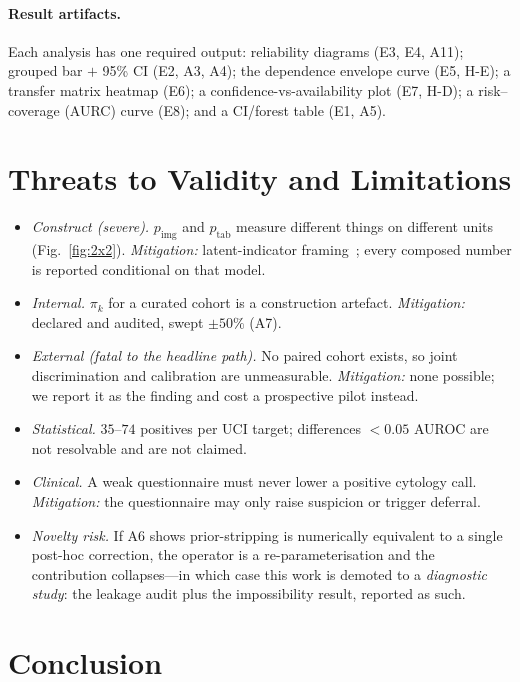 \documentclass[sigplan,nonacm,screen]{acmart}
\begin{document}
\paragraph{Result artifacts.} Each analysis has one required output: reliability diagrams (E3, E4, A11); grouped bar $+$ 95\% CI (E2, A3, A4); the dependence envelope curve (E5, H-E); a transfer matrix heatmap (E6); a confidence-vs-availability plot (E7, H-D); a risk--coverage (AURC) curve (E8); and a CI/forest table (E1, A5).

\section{Threats to Validity and Limitations}

\begin{itemize}
  \item \emph{Construct (severe).} $p_{\mathrm{img}}$ and $p_{\mathrm{tab}}$ measure different things on different units (Fig.~\ref{fig:2x2}). \emph{Mitigation:} latent-indicator framing~\cite{rutjes2007evaluation}; every composed number is reported conditional on that model.
  \item \emph{Internal.} $\pi_k$ for a curated cohort is a construction artefact. \emph{Mitigation:} declared and audited, swept $\pm50\%$ (A7).
  \item \emph{External (fatal to the headline path).} No paired cohort exists, so joint discrimination and calibration are unmeasurable. \emph{Mitigation:} none possible; we report it as the finding and cost a prospective pilot instead.
  \item \emph{Statistical.} $35$--$74$ positives per UCI target; differences $<0.05$ AUROC are not resolvable and are not claimed.
  \item \emph{Clinical.} A weak questionnaire must never lower a positive cytology call. \emph{Mitigation:} the questionnaire may only raise suspicion or trigger deferral.
  \item \emph{Novelty risk.} If A6 shows prior-stripping is numerically equivalent to a single post-hoc correction, the operator is a re-parameterisation and the contribution collapses---in which case this work is demoted to a \emph{diagnostic study}: the leakage audit plus the impossibility result, reported as such.
\end{itemize}

\section{Conclusion}
\end{document}
